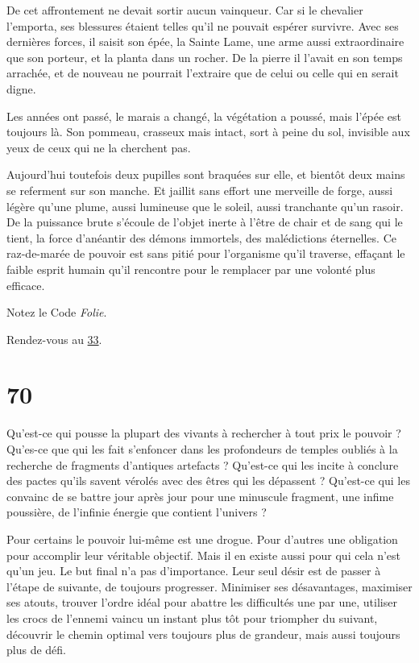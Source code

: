 \documentclass{report}
\newcommand{\gsection}[1]{
    \section{#1}
    \label{section-#1}
}
\newcommand{\glink}[1]{\hyperref[section-#1]{#1}}
\begin{document}
De cet affrontement ne devait sortir aucun vainqueur. Car si le chevalier l'emporta, ses blessures étaient telles qu'il ne pouvait espérer survivre. Avec ses dernières forces, il saisit son épée, la Sainte Lame, une arme aussi extraordinaire que son porteur, et la planta dans un rocher. De la pierre il l'avait en son temps arrachée, et de nouveau ne pourrait l'extraire que de celui ou celle qui en serait digne.

Les années ont passé, le marais a changé, la végétation a poussé, mais l'épée est toujours là. Son pommeau, crasseux mais intact, sort à peine du sol, invisible aux yeux de ceux qui ne la cherchent pas.

Aujourd'hui toutefois deux pupilles sont braquées sur elle, et bientôt deux mains se referment sur son manche. Et jaillit sans effort une merveille de forge, aussi légère qu'une plume, aussi lumineuse que le soleil, aussi tranchante qu'un rasoir. De la puissance brute s'écoule de l'objet inerte à l'être de chair et de sang qui le tient, la force d'anéantir des démons immortels, des malédictions éternelles. Ce raz-de-marée de pouvoir est sans pitié pour l'organisme qu'il traverse, effaçant le faible esprit humain qu'il rencontre pour le remplacer par une volonté plus efficace.

Notez le Code \emph{Folie}.

Rendez-vous au \glink{33}.

\gsection{70}

Qu'est-ce qui pousse la plupart des vivants à rechercher à tout prix le pouvoir ? Qu'es-ce que qui les fait s'enfoncer dans les profondeurs de temples oubliés à la recherche de fragments d'antiques artefacts ? Qu'est-ce qui les incite à conclure des pactes qu'ils savent vérolés avec des êtres qui les dépassent ? Qu'est-ce qui les convainc de se battre jour après jour pour une minuscule fragment, une infime poussière, de l'infinie énergie que contient l'univers ?

Pour certains le pouvoir lui-même est une drogue. Pour d'autres une obligation pour accomplir leur véritable objectif. Mais il en existe aussi pour qui cela n'est qu'un jeu. Le but final n'a pas d'importance. Leur seul désir est de passer à l'étape de suivante, de toujours progresser. Minimiser ses désavantages, maximiser ses atouts, trouver l'ordre idéal pour abattre les difficultés une par une, utiliser les crocs de l'ennemi vaincu un instant plus tôt pour triompher du suivant, découvrir le chemin optimal vers toujours plus de grandeur, mais aussi toujours plus de défi.
\end{document}

